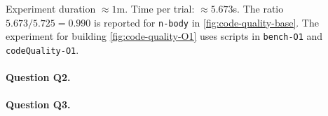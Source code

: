 \noindent Experiment duration $\approx1$m. Time per trial: $\approx5.673$s. The ratio $5.673/5.725=0.990$ is reported for {\tt n-body} in \ref{fig:code-quality-base}. The experiment for building \ref{fig:code-quality-O1} uses scripts in {\tt bench-O1} and {\tt codeQuality-O1}.


\paragraph{Question Q2.} 

\paragraph{Question Q3.} 



